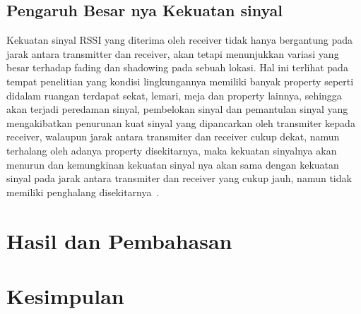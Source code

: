 \documentclass[conference]{IEEEtran}
\begin{document}
\subsection{Pengaruh Besar nya Kekuatan sinyal}
Kekuatan sinyal RSSI yang diterima oleh
receiver tidak hanya bergantung pada jarak
antara transmitter dan receiver, akan tetapi
menunjukkan variasi yang besar terhadap fading
dan shadowing pada sebuah lokasi. Hal ini
terlihat pada tempat penelitian yang kondisi
lingkungannya memiliki banyak property seperti
didalam ruangan terdapat sekat, lemari, meja dan
property lainnya, sehingga akan terjadi peredaman sinyal, pembelokan sinyal dan pemantulan
sinyal yang mengakibatkan penurunan kuat
sinyal yang dipancarkan oleh transmiter kepada
receiver, walaupun jarak antara transmiter dan
receiver cukup dekat, namun terhalang oleh
adanya property disekitarnya, maka kekuatan
sinyalnya akan menurun dan kemungkinan
kekuatan sinyal nya akan sama dengan kekuatan
sinyal pada jarak antara transmiter dan receiver
yang cukup jauh, namun tidak memiliki
penghalang disekitarnya~.




\section{Hasil dan Pembahasan}



\section{Kesimpulan}



\end{document}
